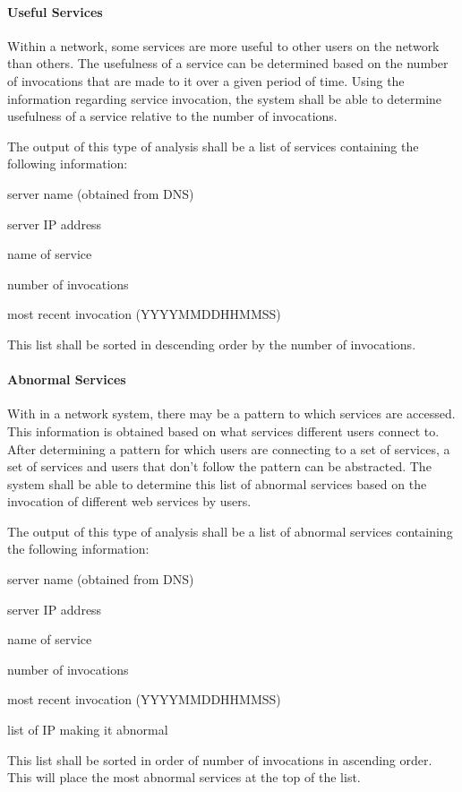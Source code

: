 \documentclass[titlepage]{article}
\begin{document}
\paragraph{Useful Services} 
Within a network, some services are more useful to other users on the network
than others. The usefulness of a service can be determined based on the number
of invocations that are made to it over a given period of time.  Using the
information regarding service invocation, the system shall be able to determine
usefulness of a service relative to the number of invocations.

The output of this type of analysis shall be a list of services containing the
following information:
\begin{itemize*}
    \item server name (obtained from DNS)
    \item server IP address
    \item name of service
    \item number of invocations
    \item most recent invocation (YYYYMMDDHHMMSS)
\end{itemize*}
This list shall be sorted in descending order by the number of invocations.

\paragraph{Abnormal Services} 
With in a network system, there may be a pattern to which services are
accessed. This information is obtained based on what services different users
connect to. After determining a pattern for which users are connecting to a set
of services, a set of services and users that don't follow the pattern can be
abstracted. The system shall be able to determine this list of abnormal
services based on the invocation of different web services by users.
            
The output of this type of analysis shall be a list of abnormal services
containing the following information:
\begin{itemize*}
    \item server name (obtained from DNS)
    \item server IP address
    \item name of service
    \item number of invocations
    \item most recent invocation (YYYYMMDDHHMMSS)
    \item list of IP making it abnormal
\end{itemize*}
This list shall be sorted in order of number of invocations in ascending order.
This will place the most abnormal services at the top of the list.
\end{document}
